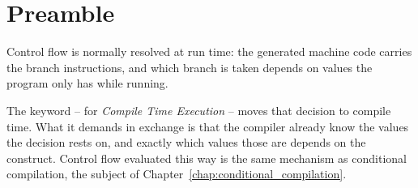 \section{Preamble}
\label{sec:flow:preamble}

Control flow is normally resolved at run time: the generated machine code carries
the branch instructions, and which branch is taken depends on values the program
only has while running.

The keyword  -- for \textit{Compile Time Execution} -- moves that
decision to compile time. What it demands in exchange is that the compiler
already know the values the decision rests on, and exactly which values those are
depends on the construct. Control flow evaluated this way is the same mechanism
as conditional compilation, the subject of
Chapter~\ref{chap:conditional_compilation}.
